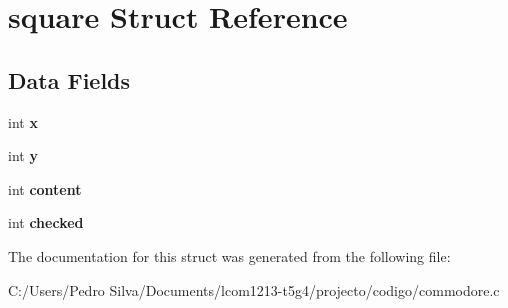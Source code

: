 \hypertarget{structsquare}{\section{square Struct Reference}
\label{structsquare}
}
\subsection*{Data Fields}
\begin{DoxyCompactItemize}
\item 
\hypertarget{structsquare_a6150e0515f7202e2fb518f7206ed97dc}{int {\bfseries x}}\label{structsquare_a6150e0515f7202e2fb518f7206ed97dc}

\item 
\hypertarget{structsquare_a0a2f84ed7838f07779ae24c5a9086d33}{int {\bfseries y}}\label{structsquare_a0a2f84ed7838f07779ae24c5a9086d33}

\item 
\hypertarget{structsquare_ac0d9098ff944738aafbf7930875bb26f}{int {\bfseries content}}\label{structsquare_ac0d9098ff944738aafbf7930875bb26f}

\item 
\hypertarget{structsquare_a71852039e7d65a0416c82b3ee2eac4d4}{int {\bfseries checked}}\label{structsquare_a71852039e7d65a0416c82b3ee2eac4d4}

\end{DoxyCompactItemize}


The documentation for this struct was generated from the following file\-:\begin{DoxyCompactItemize}
\item 
C\-:/\-Users/\-Pedro Silva/\-Documents/lcom1213-\/t5g4/projecto/codigo/commodore.\-c\end{DoxyCompactItemize}
